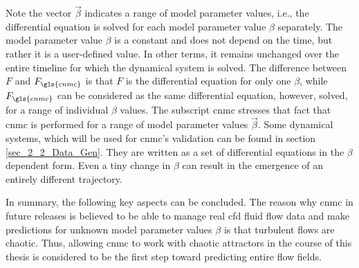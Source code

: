 Note the vector $\vec{\beta}$ indicates a range of model parameter values,  i.e., the differential equation is solved for each model parameter value $\beta$ separately.
The model parameter value $\beta$ is a constant and does not depend on the time, but rather it is a user-defined value. 
In other terms, it remains unchanged over the entire timeline for which the dynamical system is solved.
The difference between $F$ and $F_{\gls{cnmc}}$ is that $F$ is the differential equation for only one $\beta$, while $F_{\gls{cnmc}}$ can be considered as the same differential equation, however, solved, for a range of individual $\beta$ values. 
The subscript \gls{cnmc} stresses that fact that \gls{cnmc} is performed for a range of model parameter values $\vec{\beta}$.
Some dynamical systems, which will be used for \gls{cnmc}'s validation can be found in section \ref{sec_2_2_Data_Gen}. They are written as a set of differential equations in the $\beta$ dependent form.
Even a tiny change in $\beta$ can result in the emergence of an entirely different trajectory. \newline


In summary, the following key aspects can be concluded. The reason why \gls{cnmc} in future releases is believed to be able to manage real \gls{cfd} fluid flow data and make predictions for unknown model parameter values $\beta$ is that turbulent flows are chaotic. Thus, allowing \gls{cnmc} to work with chaotic attractors in the course of this thesis is considered to be the first step toward predicting entire flow fields. 
